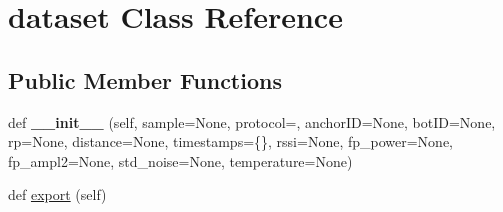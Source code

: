 \hypertarget{classjson_structures_1_1dataset}{}\section{dataset Class Reference}
\label{classjson_structures_1_1dataset}
\subsection*{Public Member Functions}
\begin{DoxyCompactItemize}
\item 
\mbox{\label{classjson_structures_1_1dataset_afef75634856981acc55069c1a3783ec9}} 
def {\bfseries \+\_\+\+\_\+init\+\_\+\+\_\+} (self, sample=None, protocol=\textquotesingle{}\textquotesingle{}, anchor\+ID=None, bot\+ID=None, rp=None, distance=None, timestamps=\{\}, rssi=None, fp\+\_\+power=None, fp\+\_\+ampl2=None, std\+\_\+noise=None, temperature=None)
\item 
def \mbox{\hyperlink{classjson_structures_1_1dataset_a68cc2498d25cf6670863c141957ac262}{export}} (self)
\end{DoxyCompactItemize}
